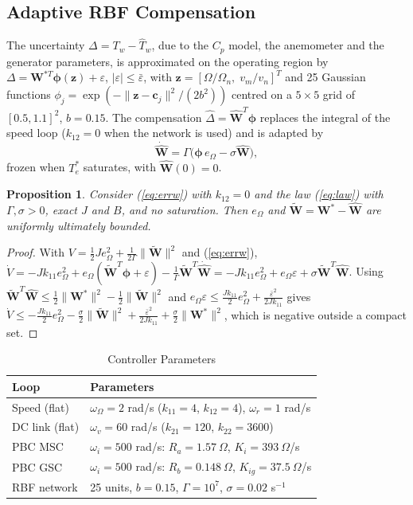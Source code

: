 \documentclass[conference]{IEEEtran}
\newtheorem{proposition}{Proposition}
\newcommand{\bv}[1]{\mathbf{#1}}
\begin{document}
\subsection{Adaptive RBF Compensation}
The uncertainty $\Delta=T_w-\hat T_w$, due to the $C_p$ model, the anemometer and the generator
parameters, is approximated on the operating region by $\Delta=\bv{W}^{*T}\boldsymbol\phi(\bv{z})+\varepsilon$,
$|\varepsilon|\le\bar\varepsilon$, with $\bv{z}=[\Omega/\Omega_n,\;v_m/v_n]^T$ and 25 Gaussian functions
$\phi_j=\exp(-\|\bv{z}-\bv{c}_j\|^2/(2b^2))$ centred on a $5\times5$ grid of $[0.5,1.1]^2$, $b=0.15$.
The compensation $\hat\Delta=\hat{\bv{W}}^T\boldsymbol\phi$ replaces the integral of the speed loop
($k_{12}=0$ when the network is used) and is adapted by
\begin{equation}
\dot{\hat{\bv{W}}} = \Gamma\bigl(\boldsymbol\phi\,e_\Omega - \sigma\hat{\bv{W}}\bigr),
\label{eq:law}
\end{equation}
frozen when $T_e^*$ saturates, with $\hat{\bv{W}}(0)=0$.

\begin{proposition}
Consider (\ref{eq:errw}) with $k_{12}=0$ and the law (\ref{eq:law}) with $\Gamma,\sigma>0$, exact $J$
and $B$, and no saturation. Then $e_\Omega$ and $\tilde{\bv{W}}=\bv{W}^*-\hat{\bv{W}}$ are uniformly
ultimately bounded.
\end{proposition}
\begin{proof}
With $V=\frac12Je_\Omega^2+\frac{1}{2\Gamma}\|\tilde{\bv{W}}\|^2$ and (\ref{eq:errw}),
$\dot V=-Jk_{11}e_\Omega^2+e_\Omega(\tilde{\bv{W}}^T\boldsymbol\phi+\varepsilon)
-\frac1\Gamma\tilde{\bv{W}}^T\dot{\hat{\bv{W}}}=-Jk_{11}e_\Omega^2+e_\Omega\varepsilon
+\sigma\tilde{\bv{W}}^T\hat{\bv{W}}$. Using
$\tilde{\bv{W}}^T\hat{\bv{W}}\le\frac12\|\bv{W}^*\|^2-\frac12\|\tilde{\bv{W}}\|^2$ and
$e_\Omega\varepsilon\le\frac{Jk_{11}}{2}e_\Omega^2+\frac{\bar\varepsilon^2}{2Jk_{11}}$ gives
$\dot V\le-\frac{Jk_{11}}{2}e_\Omega^2-\frac\sigma2\|\tilde{\bv{W}}\|^2
+\frac{\bar\varepsilon^2}{2Jk_{11}}+\frac\sigma2\|\bv{W}^*\|^2$, which is negative outside a compact set.
\end{proof}

\begin{table}[t]
\caption{Controller Parameters}
\label{tab:ctrl}
\centering
\footnotesize
\begin{tabular}{ll}
\toprule
Loop & Parameters\\
\midrule
Speed (flat) & $\omega_\Omega=2$ rad/s ($k_{11}=4$, $k_{12}=4$), $\omega_r=1$ rad/s\\
DC link (flat) & $\omega_v=60$ rad/s ($k_{21}=120$, $k_{22}=3600$)\\
PBC MSC & $\omega_i=500$ rad/s: $R_a=1.57~\Omega$, $K_i=393~\Omega$/s\\
PBC GSC & $\omega_i=500$ rad/s: $R_b=0.148~\Omega$, $K_{ig}=37.5~\Omega$/s\\
RBF network & 25 units, $b=0.15$, $\Gamma=10^7$, $\sigma=0.02$ s$^{-1}$\\
\bottomrule
\end{tabular}
\end{table}
\end{document}
